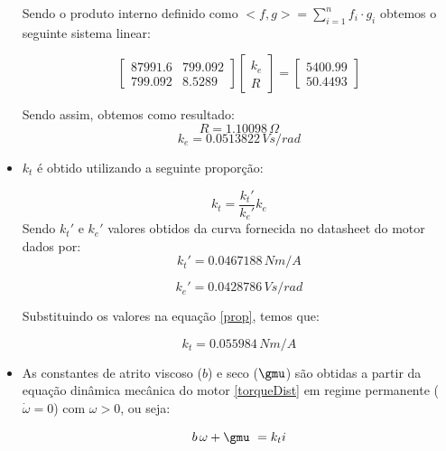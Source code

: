 \documentclass[]{politex}
\begin{document}
\begin{itemize}
Sendo o produto interno definido como $ <f,g> = \displaystyle\sum_{i=1}^n f_i \cdot g_i $ obtemos o seguinte sistema linear:

\begin{equation}
\begin{bmatrix}
87991.6 & 799.092\\
799.092 & 8.5289
\end{bmatrix}
\begin{bmatrix}
k_{e}\\
R
\end{bmatrix}= 
\begin{bmatrix}
5400.99\\
50.4493
\end{bmatrix}
\end{equation}

Sendo assim, obtemos como resultado:
\begin{equation}
R = 1.10098 \, \Omega 
\end{equation}
\begin{equation}
k_e = 0.0513822 \, V s/rad
\end{equation}

\item $k_{t}$ é obtido utilizando a seguinte proporção:

\begin{equation}
\label{prop}
k_{t} = \frac{k_{t}'}{k_{e}'} k_{e}
\end{equation}
Sendo $k_{t}'$ e $k_{e}'$ valores obtidos da curva fornecida no datasheet do motor dados por:
\begin{equation}
k_{t}' = 0.0467188 \, N m/A
\end{equation}

\begin{equation}
k_{e}' = 0.0428786 \, V s/rad
\end{equation}

Substituindo os valores na equação \eqref{prop}, temos que:

\begin{equation}
k_t = 0.055984 \, N m/A
\end{equation}

\item As constantes de atrito viscoso ($b$) e seco ($\gmu$) são obtidas a partir da equação dinâmica mecânica do motor \eqref{torqueDist} em regime permanente ($\dot{\omega}=0$) com $\omega > 0$, ou seja: 

\begin{equation}
\label{dimMec}
b \, \omega+\gmu \ = k_{t} i
\end{equation}


\end{itemize}
\end{document}
